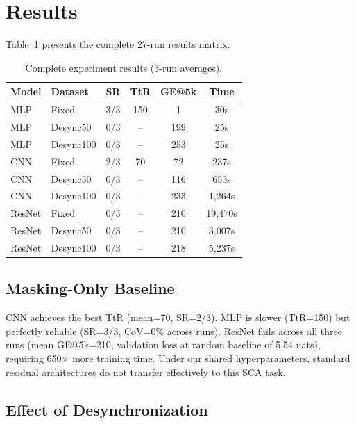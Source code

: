 \documentclass[runningheads]{llncs}
\begin{document}
\section{Results}

Table~\ref{tab:results} presents the complete 27-run results matrix.

\begin{table}[t]
\centering
\caption{Complete experiment results (3-run averages).}
\label{tab:results}
\begin{tabular}{@{}llcccc@{}}
\toprule
\textbf{Model} & \textbf{Dataset} & \textbf{SR} & \textbf{TtR} & \textbf{GE@5k} & \textbf{Time} \\
\midrule
MLP    & Fixed    & 3/3 & 150 &   1 & 30s \\
MLP    & Desync50 & 0/3 & --  & 199 & 25s \\
MLP    & Desync100& 0/3 & --  & 253 & 25s \\
CNN    & Fixed    & 2/3 & 70  &  72 & 237s \\
CNN    & Desync50 & 0/3 & --  & 116 & 653s \\
CNN    & Desync100& 0/3 & --  & 233 & 1,264s \\
ResNet & Fixed    & 0/3 & --  & 210 & 19,470s \\
ResNet & Desync50 & 0/3 & --  & 210 & 3,007s \\
ResNet & Desync100& 0/3 & --  & 218 & 5,237s \\
\bottomrule
\end{tabular}
\end{table}

\subsection{Masking-Only Baseline}

CNN achieves the best TtR (mean=70, SR=2/3). MLP is slower (TtR=150) but perfectly reliable (SR=3/3, CoV=0\% across runs). ResNet fails across all three runs (mean GE@5k=210, validation loss at random baseline of 5.54 nats), requiring 650$\times$ more training time. Under our shared hyperparameters, standard residual architectures do not transfer effectively to this SCA task.

\subsection{Effect of Desynchronization}
\end{document}
